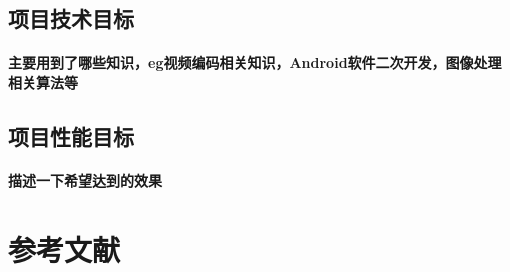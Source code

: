 \documentclass[12pt]{extarticle}
\newcommand{\<}{\langle}
\renewcommand{\>}{\rangle}
\theoremstyle{definition}
\begin{document}
\subsection{项目技术目标}
\paragraph{主要用到了哪些知识，eg视频编码相关知识，Android软件二次开发，图像处理相关算法等}
\subsection{项目性能目标}
\paragraph{描述一下希望达到的效果}

\section{参考文献}
\end{document}

